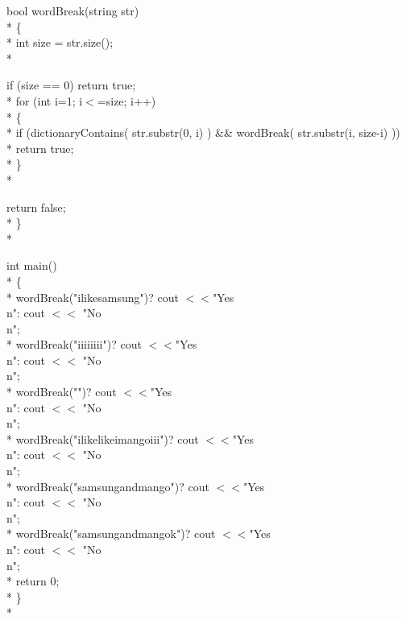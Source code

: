 \documentclass[12pt]{book}
\begin{document}
bool wordBreak(string str) \\*
\{ \\*
\phantom{x} \hspace{3ex}    int size = str.size(); \\*

 \phantom{x} \hspace{3ex}   if (size == 0) return true; \\*
\phantom{x} \hspace{3ex}    for (int i=1; i$<$=size; i++) \\*
    \{ \\*
\phantom{x} \hspace{3ex} \phantom{x} \hspace{3ex}       if (dictionaryContains( str.substr(0, i) ) \&\& 
            wordBreak( str.substr(i, size-i) ))\\* 
            return true; \\*
    \} \\*


\phantom{x} \hspace{3ex}    return false; \\*
\} \\*

int main() \\*
\{ \\*
\phantom{x} \hspace{3ex}    wordBreak("ilikesamsung")? cout $<<$"Yes\\n": cout $<<$ "No\\n"; \\*
\phantom{x} \hspace{3ex}    wordBreak("iiiiiiii")? cout $<<$"Yes\\n": cout $<<$ "No\\n"; \\*
\phantom{x} \hspace{3ex}    wordBreak("")? cout $<<$"Yes\\n": cout $<<$ "No\\n"; \\*
\phantom{x} \hspace{3ex}    wordBreak("ilikelikeimangoiii")? cout $<<$"Yes\\n": cout $<<$ "No\\n"; \\*
\phantom{x} \hspace{3ex}    wordBreak("samsungandmango")? cout $<<$"Yes\\n": cout $<<$ "No\\n"; \\*
\phantom{x} \hspace{3ex}    wordBreak("samsungandmangok")? cout $<<$"Yes\\n": cout $<<$ "No\\n"; \\*
\phantom{x} \hspace{3ex}    return 0; \\*
\} \\*
\end{document}
